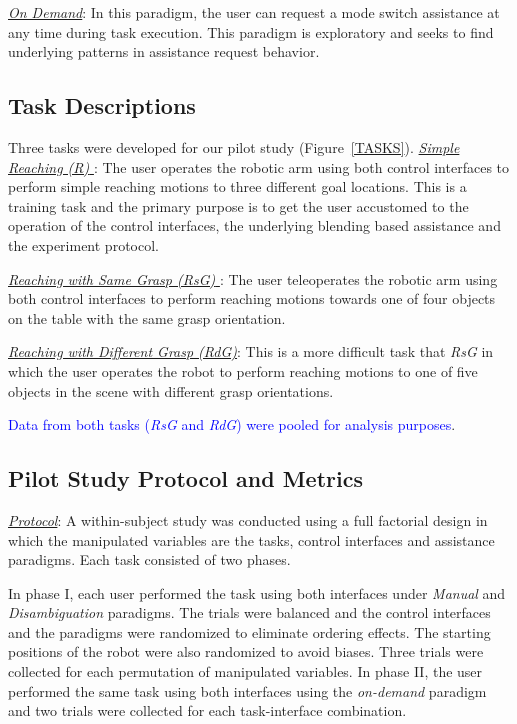 \documentclass[conference]{IEEEtran}
\begin{document}
 \noindent\underline{\textit{On Demand}}: In this paradigm, the user can request a mode switch assistance at any time during task execution. This paradigm is exploratory and seeks to find underlying patterns in assistance request behavior.
 
 \subsection{Task Descriptions}
 Three tasks were developed for our pilot study (Figure~\ref{TASKS}).
 \noindent\underline{\textit{Simple Reaching (R)} }: The user operates the robotic arm using both control interfaces to perform simple reaching motions to three different goal locations. This is a training task and the primary purpose is to get the user accustomed to the operation of the control interfaces, the underlying blending based assistance and the experiment protocol. 
 
 \noindent\underline{\textit{Reaching with Same Grasp (RsG)} }: The user teleoperates the robotic arm using both control interfaces to perform reaching motions towards one of four objects on the table with the same grasp orientation.
 
 \noindent\underline{\textit{Reaching with Different Grasp (RdG)}}: This is a more difficult task that \textit{RsG} in which the user operates the robot to perform reaching motions to one of five objects in the scene with different grasp orientations.
 
 \textcolor{blue}{Data from both tasks (\textit{RsG} and \textit{RdG})  were pooled for analysis purposes}. 

\subsection{Pilot Study Protocol and Metrics}

\noindent\underline{\textit{Protocol}}:
A within-subject study was conducted using a full factorial design in which the manipulated variables are the tasks, control interfaces and assistance paradigms. Each task consisted of two phases. 

In phase I, each user performed the task using both interfaces under \textit{Manual} and \textit{Disambiguation} paradigms. The trials were balanced and the control interfaces and the paradigms were randomized to eliminate ordering effects. The starting positions of the robot were also randomized to avoid biases. Three trials were collected for each permutation of manipulated variables. 
In phase II, the user performed the same task using both interfaces using the \textit{on-demand} paradigm and two trials were collected for each task-interface combination.  
\end{document}
